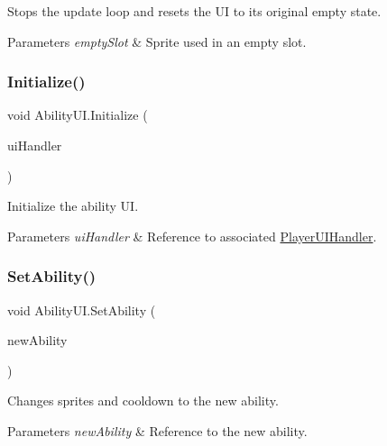 Stops the update loop and resets the UI to its original empty state. 


\begin{DoxyParams}{Parameters}
{\em empty\+Slot} & Sprite used in an empty slot.\\
\hline
\end{DoxyParams}
\hypertarget{class_ability_u_i_aaf2088cb076c1e2139d33c543104db82}{}\label{class_ability_u_i_aaf2088cb076c1e2139d33c543104db82} 
\subsubsection{\texorpdfstring{Initialize()}{Initialize()}}
{\footnotesize\ttfamily void Ability\+U\+I.\+Initialize (\begin{DoxyParamCaption}\item[{\hyperlink{class_player_u_i_handler}{Player\+U\+I\+Handler}}]{ui\+Handler }\end{DoxyParamCaption})}



Initialize the ability UI. 


\begin{DoxyParams}{Parameters}
{\em ui\+Handler} & Reference to associated \hyperlink{class_player_u_i_handler}{Player\+U\+I\+Handler}.\\
\hline
\end{DoxyParams}
\hypertarget{class_ability_u_i_aa92482fc1ded5c2c07b9fcfd7298bcf9}{}\label{class_ability_u_i_aa92482fc1ded5c2c07b9fcfd7298bcf9} 
\subsubsection{\texorpdfstring{Set\+Ability()}{SetAbility()}}
{\footnotesize\ttfamily void Ability\+U\+I.\+Set\+Ability (\begin{DoxyParamCaption}\item[{\hyperlink{class_ability}{Ability}}]{new\+Ability }\end{DoxyParamCaption})}



Changes sprites and cooldown to the new ability. 


\begin{DoxyParams}{Parameters}
{\em new\+Ability} & Reference to the new ability.\\
\hline
\end{DoxyParams}
\hypertarget{class_ability_u_i_a64f213c19ca4bb23414f0b8c532b98c7}{}\label{class_ability_u_i_a64f213c19ca4bb23414f0b8c532b98c7} 
